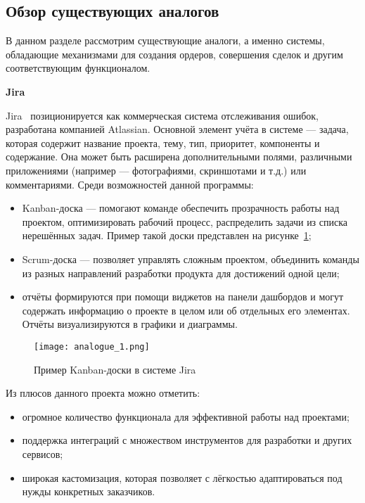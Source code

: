 \subsection{Обзор существующих аналогов}\label{sec:analysis:analogues}

В данном разделе рассмотрим существующие аналоги, а именно системы, обладающие механизмами для создания ордеров, совершения сделок и другим соответствующим функционалом.

\bigskip
\textbf{Jira}

Jira~\cite{analogue_1} позиционируется как коммерческая система отслеживания ошибок, разработана компанией Atlassian. Основной элемент учёта в системе — задача, которая содержит название проекта, тему, тип, приоритет, компоненты и содержание. Она может быть расширена дополнительными полями, различными приложениями (например — фотографиями, скриншотами и т.д.) или комментариями. Среди возможностей данной программы:
\begin{itemize}
    \item Kanban-доска — помогают команде обеспечить прозрачность работы над проектом, оптимизировать рабочий процесс, распределить задачи из списка нерешённых задач. Пример такой доски представлен на рисунке~\ref{fig:analysis:analogue_1:picture};
    \item Scrum-доска — позволяет управлять сложным проектом, объединить команды из разных направлений разработки продукта для достижений одной цели;
    \item отчёты формируются при помощи виджетов на панели дашбордов и могут содержать информацию о проекте в целом или об отдельных его элементах. Отчёты визуализируются в графики и диаграммы.
\end{itemize}

\begin{figure}[ht]
    \centering
	\texttt{[image: analogue\_1.png]}
	\caption{Пример Kanban-доски в системе Jira}\label{fig:analysis:analogue_1:picture}
\end{figure}

Из плюсов данного проекта можно отметить:
\begin{itemize}
    \item огромное количество функционала для эффективной работы над проектами;
    \item поддержка интеграций с множеством инструментов для разработки и других сервисов;
    \item широкая кастомизация, которая позволяет с лёгкостью адаптироваться под нужды конкретных заказчиков.
\end{itemize}

